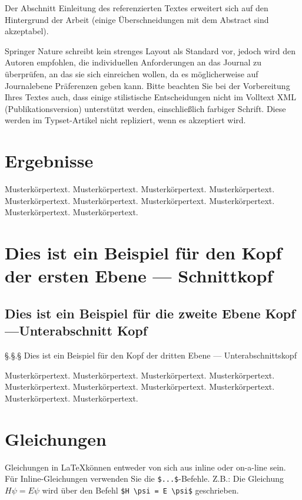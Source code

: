 \documentclass[pdflatex,sn-mathphys-num]{sn-jnl}%
\theoremstyle{thmstyleone}%
\theoremstyle{thmstyletwo}%
\theoremstyle{thmstylethree}%
\begin{document}
Der Abschnitt Einleitung des referenzierten Textes \cite{bib1} erweitert sich auf den Hintergrund der Arbeit (einige Überschneidungen mit dem Abstract sind akzeptabel).

Springer Nature schreibt kein strenges Layout als Standard vor, jedoch wird den Autoren empfohlen, die individuellen Anforderungen an das Journal zu überprüfen, an das sie sich einreichen wollen, da es möglicherweise auf Journalebene Präferenzen geben kann. Bitte beachten Sie bei der Vorbereitung Ihres Textes auch, dass einige stilistische Entscheidungen nicht im Volltext XML (Publikationsversion) unterstützt werden, einschließlich farbiger Schrift. Diese werden im Typset-Artikel nicht repliziert, wenn es akzeptiert wird. 

\section{Ergebnisse}\label{sec2}

Musterkörpertext. Musterkörpertext. Musterkörpertext. Musterkörpertext. Musterkörpertext. Musterkörpertext. Musterkörpertext. Musterkörpertext. Musterkörpertext. Musterkörpertext.

\section{Dies ist ein Beispiel für den Kopf der ersten Ebene — Schnittkopf}\label{sec3}

\subsection{Dies ist ein Beispiel für die zweite Ebene Kopf—Unterabschnitt Kopf}\label{subsec2}

§.§.§ Dies ist ein Beispiel für den Kopf der dritten Ebene — Unterabschnittskopf \label{subsubsec2}

Musterkörpertext. Musterkörpertext. Musterkörpertext. Musterkörpertext. Musterkörpertext. Musterkörpertext. Musterkörpertext. Musterkörpertext. Musterkörpertext. Musterkörpertext. 

\section{Gleichungen}\label{sec4}

Gleichungen in \LaTeX können entweder von sich aus inline oder on-a-line sein. Für Inline-Gleichungen verwenden Sie die \verb+$...$+-Befehle. Z.B.: Die Gleichung $H\psi = E \psi$ wird über den Befehl \verb+$H \psi = E \psi$+ geschrieben.
\end{document}
